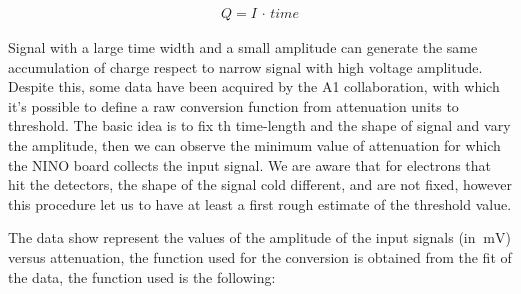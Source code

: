 \begin{align}
Q = I \, \cdot \, time
\end{align}

Signal with a large time width and a small amplitude can generate the same accumulation of charge respect to narrow signal with high voltage amplitude. Despite this, some data have been acquired by the A1 collaboration, with which it's possible to define a raw conversion function from attenuation units to threshold. The basic idea is to fix th time-length and the shape of signal and vary the amplitude, then we can observe the minimum value of attenuation for which the NINO board collects the input signal. We are aware that for electrons that hit the detectors, the shape of the signal cold different, and are not fixed, however this procedure let us to have at least a first rough estimate of the threshold value.

\begin{figure}[hbtp]
\centering
{}
\end{figure}

The data show represent the values of the amplitude of the input signals (in $\SI{}{\milli \volt}$) versus attenuation, the function used for the conversion is obtained from the fit of the data, the function used is the following: 

